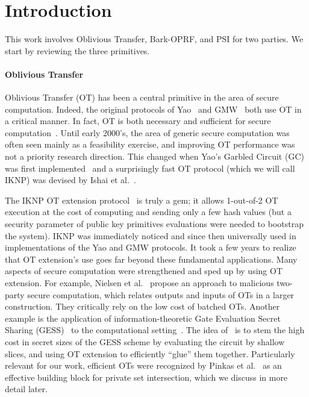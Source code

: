 
\section{Introduction}
\label{sect:intro}

This work involves Oblivious Transfer, Bark-OPRF, and PSI for two parties.  We start by reviewing the three primitives.

\paragraph{Oblivious Transfer}
Oblivious Transfer (OT) has been a central primitive in the area of secure computation.  Indeed, the original protocols of Yao~\cite{FOCS:Yao86} and GMW~\cite{GoldreichBook2,STOC:GolMicWig87} both use OT in a critical manner.  In fact, OT is both necessary and sufficient for secure computation~\cite{STOC:Kilian88}.  Until early 2000's, the area of generic secure computation was often seen mainly as a feasibility exercise, and improving  OT performance was not a priority research direction.  This changed when Yao's Garbled Circuit (GC) was first implemented~\cite{Fairplay} and a surprisingly fast OT protocol (which we will call IKNP) was devised by Ishai et al.~\cite{C:IKNP03}.

The IKNP OT extension protocol~\cite{C:IKNP03} is truly a gem; it allows 1-out-of-2 OT execution at the cost of computing and sending only a few hash values (but a security parameter of public key primitives evaluations were needed to bootstrap the system).  IKNP was immediately noticed and since then universally used in implementations of the Yao and GMW protocols. It took a few years to realize that OT extension's use goes far beyond these fundamental applications.  Many aspects of secure computation were strengthened  and sped up by using OT extension.  For example, Nielsen et al.~\cite{C:NNOB12} propose  an approach to malicious  two-party secure computation, which relates outputs and inputs of OTs in a larger construction.  They critically rely on the low cost of batched OTs.
Another example is the application of information-theoretic Gate Evaluation Secret Sharing (GESS)~\cite{AC:Kolesnikov05} to the computational setting~\cite{SCN:KolKum12}.  The idea of~\cite{SCN:KolKum12} is to stem the high cost in secret sizes of the GESS scheme by evaluating the circuit by shallow slices, and using OT extension to efficiently ``glue'' them together. Particularly relevant for our work, efficient OTs were recognized by Pinkas et al.~\cite{DBLP:conf/uss/Pinkas0Z14} as an effective building block for private set intersection, which we discuss in more detail later.

